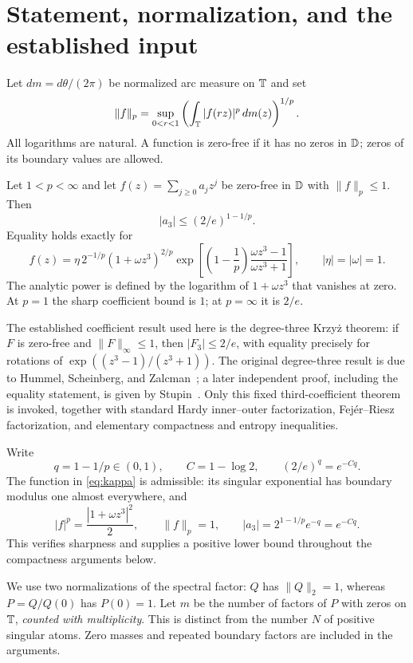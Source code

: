 \section{Statement, normalization, and the established input}
Let $dm=d\theta/(2\pi)$ be normalized arc measure on $\mathbb T$ and set
\[
 \|f\|_p=\sup_{0<r<1}\left(\int_{\mathbb T}|f(rz)|^p\,dm(z)\right)^{1/p}.
\]
All logarithms are natural. A function is zero-free if it has no zeros
in $\mathbb D$; zeros of its boundary values are allowed.

\begin{theorem}\label{thm:main}
Let $1<p<\infty$ and let $f(z)=\sum_{j\ge0}a_jz^j$ be zero-free in $\mathbb D$
with $\|f\|_p\le1$. Then
\begin{equation}\label{eq:main}
 |a_3|\le(2/e)^{1-1/p}.
\end{equation}
Equality holds exactly for
\begin{equation}\label{eq:kappa}
 f(z)=\eta\,2^{-1/p}(1+\omega z^3)^{2/p}
 \exp\left[\left(1-\frac1p\right)
             \frac{\omega z^3-1}{\omega z^3+1}\right],
 \qquad |\eta|=|\omega|=1.
\end{equation}
The analytic power is defined by the logarithm of $1+\omega z^3$ that
vanishes at zero. At $p=1$ the sharp coefficient bound is $1$; at
$p=\infty$ it is $2/e$.
\end{theorem}

The established coefficient result used here is the degree-three
Krzy\.{z} theorem: if $F$ is zero-free and $\|F\|_\infty\le1$, then
$|F_3|\le2/e$, with equality precisely for rotations of
$\exp((z^3-1)/(z^3+1))$. The original degree-three result is due to
Hummel, Scheinberg, and Zalcman~\cite{HSZ}; a later independent proof,
including the equality statement, is given by Stupin~\cite{Stupin}.
Only this fixed third-coefficient theorem is invoked, together with
standard Hardy inner--outer factorization, Fej\'er--Riesz factorization,
and elementary compactness and entropy inequalities.

Write
\[
 q=1-1/p\in(0,1),\qquad C=1-\log2,
 \qquad (2/e)^q=e^{-Cq}.
\]
The function in \eqref{eq:kappa} is admissible: its singular exponential
has boundary modulus one almost everywhere, and
\[
 |f|^p=\frac{|1+\omega z^3|^2}{2},\qquad
 \|f\|_p=1,\qquad |a_3|=2^{1-1/p}e^{-q}=e^{-Cq}.
\]
This verifies sharpness and supplies a positive lower bound throughout
the compactness arguments below.

We use two normalizations of the spectral factor: $Q$ has $\|Q\|_2=1$,
whereas $P=Q/Q(0)$ has $P(0)=1$. Let $m$ be the number of factors of $P$
with zeros on $\mathbb T$, \emph{counted with multiplicity}. This is distinct
from the number $N$ of positive singular atoms. Zero masses and repeated
boundary factors are included in the arguments.
